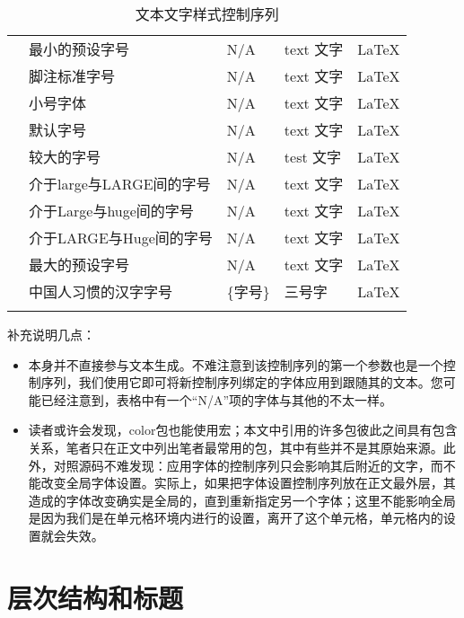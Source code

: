 \begin{center}
\begin{longtable}{C{2.5cm}C{2.5cm}C{4cm}C{2cm}C{1.5cm}}
		 & 最小的预设字号 & N/A & \tiny text 文字 & \LaTeX \\
		 & 脚注标准字号 & N/A & \footnotesize text 文字 & \LaTeX \\
		 & 小号字体 & N/A & \small text 文字 & \LaTeX \\
		 & 默认字号 & N/A & \normalsize text 文字 & \LaTeX \\
		 & 较大的字号 & N/A & \large test 文字 & \LaTeX \\
		 & 介于large与LARGE间的字号 & N/A & \Large text 文字 & \LaTeX \\
		 & 介于Large与huge间的字号 & N/A & \LARGE text 文字 & \LaTeX \\
		 & 介于LARGE与Huge间的字号 & N/A & \huge text 文字 & \LaTeX \\
		 & 最大的预设字号 & N/A & \Huge text 文字 & \LaTeX \\
		 & 中国人习惯的汉字字号 & \{字号\} &  三号字 & \LaTeX \\
		\hline
		\caption{文本文字样式控制序列}\label{table::font_control_sequences}
	\end{longtable}
\end{center}

补充说明几点：

\begin{itemize}

\item {}本身并不直接参与文本生成。不难注意到该控制序列的第一个参数也是一个控制序列，我们使用它即可将新控制序列绑定的字体应用到跟随其的文本。您可能已经注意到，表格中有一个“N/A”项的字体与其他的不太一样。

\item 读者或许会发现，color包也能使用宏；本文中引用的许多包彼此之间具有包含关系，笔者只在正文中列出笔者最常用的包，其中有些并不是其原始来源。此外，对照源码不难发现：应用字体的控制序列只会影响其后附近的文字，而不能改变全局字体设置。实际上，如果把字体设置控制序列放在正文最外层，其造成的字体改变确实是全局的，直到重新指定另一个字体；这里不能影响全局是因为我们是在单元格环境内进行的设置，离开了这个单元格，单元格内的设置就会失效。

\end{itemize}

\resetfont

\section{层次结构和标题}

